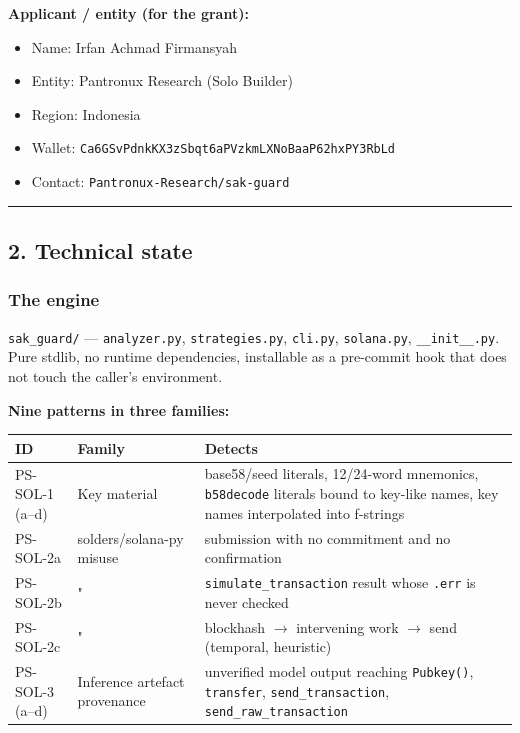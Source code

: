\documentclass[10pt,a4paper]{article}
\begin{document}
\textbf{Applicant / entity (for the grant):}
\begin{itemize}
\item Name: Irfan Achmad Firmansyah
\item Entity: Pantronux Research (Solo Builder)
\item Region: Indonesia
\item Wallet: \texttt{Ca6GSvPdnkKX3zSbqt6aPVzkmLXNoBaaP62hxPY3RbLd}
\item Contact: \texttt{Pantronux-Research/sak-guard}
\end{itemize}

\vspace{3pt}\hrule\vspace{5pt}

\subsection*{2. Technical state}

\subsubsection*{The engine}

\texttt{sak\_guard/} --- \texttt{analyzer.py}, \texttt{strategies.py}, \texttt{cli.py}, \texttt{solana.py}, \texttt{\_\_init\_\_.py}.
Pure stdlib, no runtime dependencies, installable as a pre-commit hook that does
not touch the caller's environment.

\textbf{Nine patterns in three families:}

\begin{longtable}{@{}p{} p{} p{} @{}}\toprule
ID & Family & Detects \\
\midrule
PS-SOL-1 (a–d) & Key material & base58/seed literals, 12/24-word mnemonics, \texttt{b58decode} literals bound to key-like names, key names interpolated into f-strings \\
PS-SOL-2a & solders/solana-py misuse & submission with no commitment and no confirmation \\
PS-SOL-2b & " & \texttt{simulate\_transaction} result whose \texttt{.err} is never checked \\
PS-SOL-2c & " & blockhash $\rightarrow$ intervening work $\rightarrow$ send (temporal, heuristic) \\
PS-SOL-3 (a–d) & Inference artefact provenance & unverified model output reaching \texttt{Pubkey()}, \texttt{transfer}, \texttt{send\_transaction}, \texttt{send\_raw\_transaction} \\
\bottomrule\end{longtable}
\end{document}
